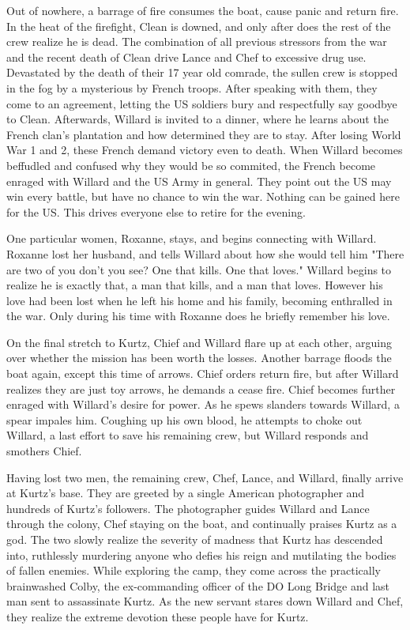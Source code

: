\documentclass[a4paper,man,natbib]{apa6}
\begin{document}
Out of nowhere, a barrage of fire consumes the boat, cause panic and return fire. In the heat of the firefight, Clean is downed, and only after does the rest of the crew realize he is dead. 
The combination of all previous stressors from the war and the recent death of Clean drive Lance and Chef to excessive drug use. Devastated by the death of their 17 year old comrade, the sullen crew is stopped in the fog by a mysterious by French troops. After speaking with them, they come to an agreement, letting the US soldiers bury and respectfully say goodbye to Clean. Afterwards, Willard is invited to a dinner, where he learns about the French clan's plantation and how determined they are to stay. After losing World War 1 and 2, these French demand victory even to death. When Willard becomes beffudled and confused why they would be so commited, the French become enraged with Willard and the US Army in general. They point out the US may win every battle, but have no chance to win the war. Nothing can be gained here for the US. This drives everyone else to retire for the evening.

One particular women, Roxanne, stays, and begins connecting with Willard. Roxanne lost her husband, and tells Willard about how she would tell him "There are two of you don't you see? One that kills. One that loves." Willard begins to realize he is exactly that, a man that kills, and a man that loves. However his love had been lost when he left his home and his family, becoming enthralled in the war. Only during his time with Roxanne does he briefly remember his love.

On the final stretch to Kurtz, Chief and Willard flare up at each other, arguing over whether the mission has been worth the losses. Another barrage floods the boat again, except this time of arrows. Chief orders return fire, but after Willard realizes they are just toy arrows, he demands a cease fire. Chief becomes further enraged with Willard's desire for power. As he spews slanders towards Willard, a spear impales him. Coughing up his own blood, he attempts to choke out Willard, a last effort to save his remaining crew, but Willard responds and smothers Chief.

Having lost two men, the remaining crew, Chef, Lance, and Willard, finally arrive at Kurtz's base. They are greeted by a single American photographer and hundreds of Kurtz's followers. The photographer guides Willard and Lance through the colony, Chef staying on the boat, and continually praises Kurtz as a god. The two slowly realize the severity of madness that Kurtz has descended into, ruthlessly murdering anyone who defies his reign and mutilating the bodies of fallen enemies. While exploring the camp, they come across the practically brainwashed Colby, the ex-commanding officer of the DO Long Bridge and last man sent to assassinate Kurtz. As the new servant stares down Willard and Chef, they realize the extreme devotion these people have for Kurtz.
\end{document}
